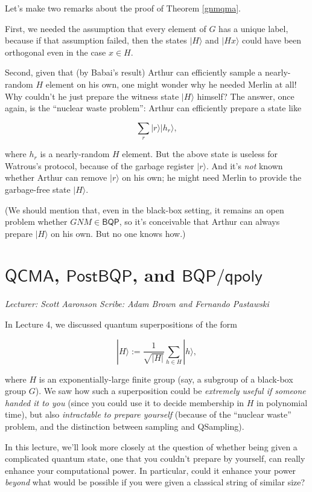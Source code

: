 \documentclass[12pt]{report}
\theoremstyle{plain}
\theoremstyle{definition}
\renewcommand{\ket}[1]{|#1\rangle}
\newcommand{\lecture}[3]{%
  \chapter{#3}%
  \vspace{-5ex}%
  \textit{Lecturer: #1 \hfill Scribe: #2}\par%
  \vspace{1ex}\titlerule\vspace{2ex}}
\begin{document}
Let's make two remarks about the proof of Theorem \ref{gnmqma}.

First, we needed the assumption that every element of $G$ has a unique label, because if that assumption failed, then the states $\ket{H}$ and $\ket{Hx}$ could have been orthogonal even in the case $x\in H$.

Second, given that (by Babai's result) Arthur can efficiently sample a nearly-random $H$ element on his own, one might wonder why he needed Merlin at all!  Why couldn't he just prepare the witness state $\ket{H}$ himself?  The answer, once again, is the ``nuclear waste problem'': Arthur can efficiently prepare a state like

$$\sum_r \ket{r}\ket{h_r},$$

\noindent where $h_r$ is a nearly-random $H$ element.  But the above state is useless for Watrous's protocol, because of the garbage register $\ket{r}$.  And it's {\em not} known whether Arthur can remove $\ket{r}$ on his own; he might need Merlin to provide the garbage-free state $\ket{H}$.

(We should mention that, even in the black-box setting, it remains an open problem whether $GNM\in \mathsf{BQP}$, so it's conceivable that Arthur can always prepare $\ket{H}$ on his own.  But no one knows how.)

\lecture{Scott Aaronson}{Adam Brown and Fernando Pastawski}{$\mathsf{QCMA}$, $\mathsf{PostBQP}$, and $\mathsf{BQP/qpoly}$}

In Lecture 4, we discussed quantum superpositions of the form

$$\ket{H}  := \frac{1}{\sqrt{| H |}} \sum_{h \in H} \ket{h},$$

\noindent where $H$ is an exponentially-large finite group (say, a subgroup of a black-box group $G$).  We saw how such a superposition could be {\em extremely useful if someone handed it to you} (since you could use it to decide membership in $H$ in polynomial time), but also {\em intractable to prepare yourself} (because of the ``nuclear waste'' problem, and the distinction between sampling and QSampling).

In this lecture, we'll look more closely at the question of whether being given a complicated quantum state, one that you couldn't prepare by yourself, can really enhance your computational power.  In particular, could it enhance your power {\em beyond} what would be possible if you were given a classical string of similar size?
\end{document}
